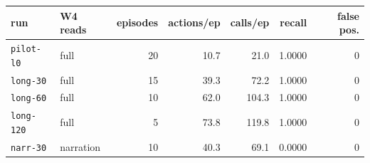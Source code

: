 \begin{tabular}{llrrrrr}
\toprule
run & W4 reads & episodes & actions/ep & calls/ep & recall & false pos. \\
\midrule
\texttt{pilot-l0} & full & 20 & 10.7 & 21.0 & 1.0000 & 0 \\
\texttt{long-30} & full & 15 & 39.3 & 72.2 & 1.0000 & 0 \\
\texttt{long-60} & full & 10 & 62.0 & 104.3 & 1.0000 & 0 \\
\texttt{long-120} & full & 5 & 73.8 & 119.8 & 1.0000 & 0 \\
\texttt{narr-30} & narration & 10 & 40.3 & 69.1 & 0.0000 & 0 \\
\bottomrule
\end{tabular}
\par{}
